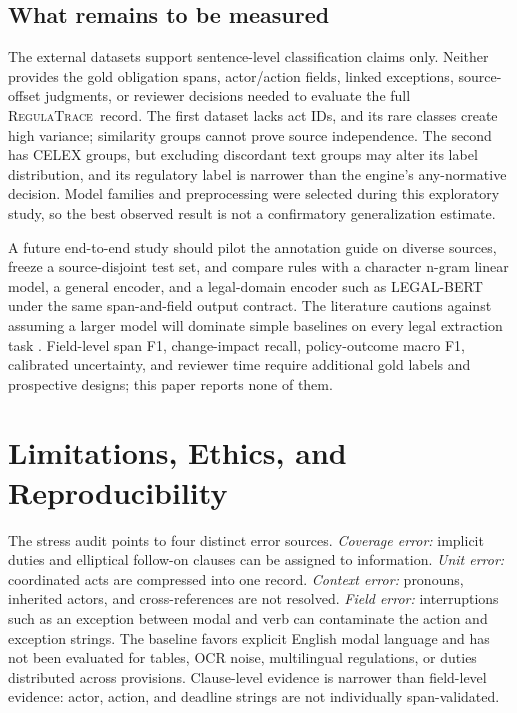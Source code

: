 \documentclass[11pt,a4paper]{article}
\newcommand{\system}{\textsc{RegulaTrace}}
\begin{document}
\subsection{What remains to be measured}
The external datasets support sentence-level classification claims only. Neither provides the gold obligation spans, actor/action fields, linked exceptions, source-offset judgments, or reviewer decisions needed to evaluate the full \system\ record. The first dataset lacks act IDs, and its rare classes create high variance; similarity groups cannot prove source independence. The second has CELEX groups, but excluding discordant text groups may alter its label distribution, and its regulatory label is narrower than the engine's any-normative decision. Model families and preprocessing were selected during this exploratory study, so the best observed result is not a confirmatory generalization estimate.

A future end-to-end study should pilot the annotation guide on diverse sources, freeze a source-disjoint test set, and compare rules with a character n-gram linear model, a general encoder, and a legal-domain encoder such as LEGAL-BERT \cite{legalbert} under the same span-and-field output contract. The literature cautions against assuming a larger model will dominate simple baselines on every legal extraction task \cite{piskorski2025}. Field-level span F1, change-impact recall, policy-outcome macro F1, calibrated uncertainty, and reviewer time require additional gold labels and prospective designs; this paper reports none of them.

\section{Limitations, Ethics, and Reproducibility}
The stress audit points to four distinct error sources. \emph{Coverage error:} implicit duties and elliptical follow-on clauses can be assigned to information. \emph{Unit error:} coordinated acts are compressed into one record. \emph{Context error:} pronouns, inherited actors, and cross-references are not resolved. \emph{Field error:} interruptions such as an exception between modal and verb can contaminate the action and exception strings. The baseline favors explicit English modal language and has not been evaluated for tables, OCR noise, multilingual regulations, or duties distributed across provisions. Clause-level evidence is narrower than field-level evidence: actor, action, and deadline strings are not individually span-validated.
\end{document}
